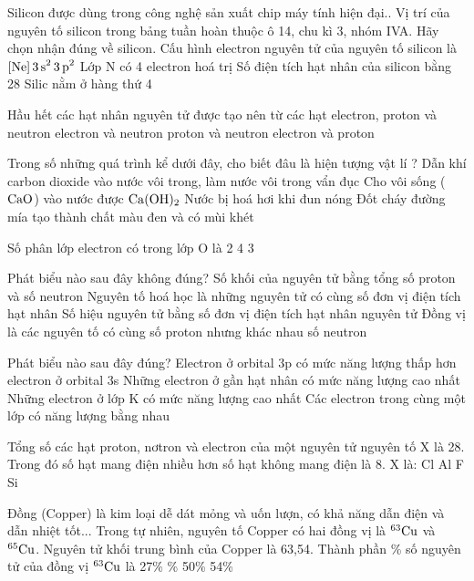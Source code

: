 \documentclass[11pt,a4paper]{article}
\begin{document}
\begin{ex}
Silicon được dùng trong công nghệ sản xuất chip máy tính hiện đại.. Vị trí của nguyên tố silicon trong bảng tuần hoàn thuộc ô 14, chu kì 3, nhóm IVA. Hãy chọn nhận đúng về silicon.
\choice
{\True Cấu hình electron nguyên tử của nguyên tố silicon là $\ce{[Ne] 3s^2 3p^2}$}
{Lớp N có 4 electron hoá trị}
{Số điện tích hạt nhân của silicon bằng 28}
{Silic nằm ở hàng thứ 4}
\end{ex}
\begin{ex}
Hầu hết các hạt nhân nguyên tử được tạo nên từ các hạt
\choice
{electron, proton và neutron}
{electron và neutron}
{\True proton và neutron}
{electron và proton}
\end{ex}
\begin{ex}
Trong số những quá trình kể dưới đây, cho biết đâu là hiện tượng vật lí ?
\choice
{Dẫn khí carbon dioxide vào nước vôi trong, làm nước vôi trong vẩn đục}
{Cho vôi sống ($\ce{CaO}$) vào nước được $\ce{Ca(OH)2}$}
{\True Nước bị hoá hơi khi đun nóng}
{Đốt cháy đường mía tạo thành chất màu đen và có mùi khét}
\end{ex}
\begin{ex}
Số phân lớp electron có trong lớp O là
\choice
{2}
{4}
{3}
{}
\end{ex}
\begin{ex}
Phát biểu nào sau đây không đúng?
\choice
{Số khối của nguyên tử bằng tổng số proton và số neutron}
{Nguyên tố hoá học là những nguyên tử có cùng số đơn vị điện tích hạt nhân}
{Số hiệu nguyên tử bằng số đơn vị điện tích hạt nhân nguyên tử}
{\True Đồng vị là các nguyên tố có cùng số proton nhưng khác nhau số neutron}
\end{ex}
\begin{ex}
Phát biểu nào sau đây đúng?
\choice
{Electron ở orbital 3p có mức năng lượng thấp hơn electron ở orbital 3s}
{Những electron ở gần hạt nhân có mức năng lượng cao nhất}
{\True Những electron ở lớp K có mức năng lượng cao nhất}
{Các electron trong cùng một lớp có năng lượng bằng nhau}
\end{ex}
\begin{ex}
Tổng số các hạt proton, nơtron và electron của một nguyên tử nguyên tố X là 28. Trong đó số hạt mang điện nhiều hơn số hạt không mang điện là 8. X là:
\choice
{Cl}
{Al}
{\True F}
{Si}
\end{ex}
\begin{ex}
Đồng (Copper) là kim loại dễ dát mỏng và uốn lượn, có khả năng dẫn điện và dẫn nhiệt tốt... Trong tự nhiên, nguyên tố Copper có hai đồng vị là $^{63}\ce{Cu}$ và $^{65}\ce{Cu}$. Nguyên tử khối trung bình của Copper là 63,54. Thành phần \% số nguyên tử của đồng vị $^{63}\ce{Cu}$ là
\choice
{27\%}
{\%}
{50\%}
{54\%}
\end{ex}
\end{document}
